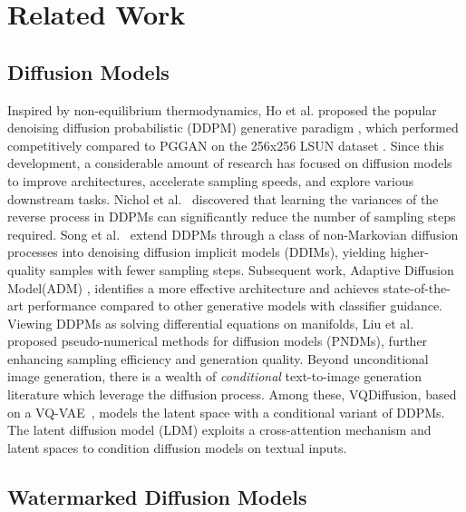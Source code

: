 \section{Related Work}
\subsection{Diffusion Models}

Inspired by non-equilibrium thermodynamics, Ho et al. proposed the popular denoising diffusion probabilistic (DDPM) generative paradigm \cite{ho2020denoising}, which performed competitively compared to PGGAN \cite{guo2021pggan} on the 256x256 LSUN dataset \cite{yu2015lsun}. Since this development, a considerable amount of research has focused on diffusion models to improve architectures, accelerate sampling speeds, and explore various downstream tasks. Nichol et al.~\cite{nichol2021improved} discovered that learning the variances of the reverse process in DDPMs can significantly reduce the number of sampling steps required. Song et al.~\cite{song2020denoising} extend DDPMs through a class of non-Markovian diffusion processes into denoising diffusion implicit models (DDIMs), yielding higher-quality samples with fewer sampling steps. Subsequent work, Adaptive Diffusion Model(ADM) \cite{li2024adm}, identifies a more effective architecture and achieves state-of-the-art performance compared to other generative models with classifier guidance. Viewing DDPMs as solving differential equations on manifolds, Liu et al.~\cite{liu2022pseudo} proposed pseudo-numerical methods for diffusion models (PNDMs), further enhancing sampling efficiency and generation quality. Beyond unconditional image generation, there is a wealth of \textit{conditional} text-to-image generation literature which leverage the diffusion process. Among these, VQDiffusion, based on a VQ-VAE~\cite{van2017neural}, models the latent space with a conditional variant of DDPMs. The latent diffusion model (LDM) \cite{rombach2022high} exploits a cross-attention mechanism and latent spaces to condition diffusion models on textual inputs.



\subsection{Watermarked Diffusion Models}



